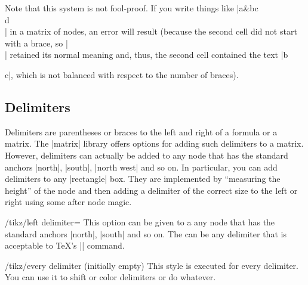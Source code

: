 Note that this system is not fool-proof. If you write things like |a&b{c\\d}\\|
in a matrix of nodes, an error will result (because the second cell did not
start with a brace, so |\\| retained its normal meaning and, thus, the second
cell contained the text |b{c|, which is not balanced with respect to the number
of braces).


\subsection{Delimiters}

Delimiters are parentheses or braces to the left and right of a formula or a
matrix. The |matrix| library offers options for adding such delimiters to a
matrix. However, delimiters can actually be added to any node that has the
standard anchors |north|, |south|, |north west| and so on. In particular, you
can add delimiters to any |rectangle| box. They are implemented by ``measuring
the height'' of the node and then adding a delimiter of the correct size to the
left or right using some after node magic.

\begin{key}{/tikz/left delimiter=}
    This option can be given to a any node that has the standard anchors
    |north|, |south| and so on. The  can be any delimiter that
    is acceptable to \TeX's |\left| command.
\begin{codeexample}[preamble={\usetikzlibrary{matrix}}]
\end{codeexample}

\begin{codeexample}[preamble={\usetikzlibrary{matrix}}]
\end{codeexample}

    \begin{stylekey}{/tikz/every delimiter (initially \normalfont empty)}
        This style is executed for every delimiter. You can use it to shift or
        color delimiters or do whatever.
    \end{stylekey}


\end{key}}
